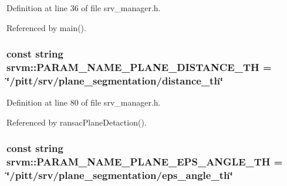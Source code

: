 Definition at line 36 of file srv\-\_\-manager.\-h.



Referenced by main().

\hypertarget{namespacesrvm_afdcd3222bf4aee9b48f2eb9f56b496e5}{
\subsubsection[{P\-A\-R\-A\-M\-\_\-\-N\-A\-M\-E\-\_\-\-P\-L\-A\-N\-E\-\_\-\-D\-I\-S\-T\-A\-N\-C\-E\-\_\-\-T\-H}]{\setlength{\rightskip}{0pt plus 5cm}const string srvm\-::\-P\-A\-R\-A\-M\-\_\-\-N\-A\-M\-E\-\_\-\-P\-L\-A\-N\-E\-\_\-\-D\-I\-S\-T\-A\-N\-C\-E\-\_\-\-T\-H = \char`\"{}/pitt/srv/plane\-\_\-segmentation/distance\-\_\-th\char`\"{}}}\label{namespacesrvm_afdcd3222bf4aee9b48f2eb9f56b496e5}


Definition at line 80 of file srv\-\_\-manager.\-h.



Referenced by ransac\-Plane\-Detaction().

\hypertarget{namespacesrvm_a2a1ca687f68863e4c300c2cd269c53ac}{
\subsubsection[{P\-A\-R\-A\-M\-\_\-\-N\-A\-M\-E\-\_\-\-P\-L\-A\-N\-E\-\_\-\-E\-P\-S\-\_\-\-A\-N\-G\-L\-E\-\_\-\-T\-H}]{\setlength{\rightskip}{0pt plus 5cm}const string srvm\-::\-P\-A\-R\-A\-M\-\_\-\-N\-A\-M\-E\-\_\-\-P\-L\-A\-N\-E\-\_\-\-E\-P\-S\-\_\-\-A\-N\-G\-L\-E\-\_\-\-T\-H = \char`\"{}/pitt/srv/plane\-\_\-segmentation/eps\-\_\-angle\-\_\-th\char`\"{}}}\label{namespacesrvm_a2a1ca687f68863e4c300c2cd269c53ac}


